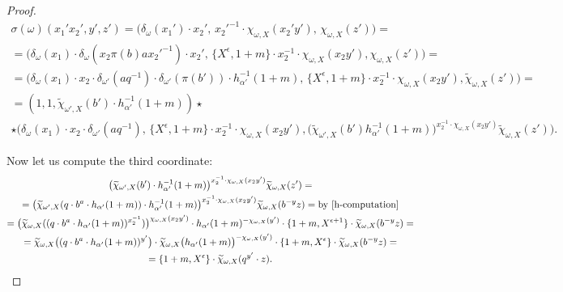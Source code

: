 \begin{proof}
\begin{multline} \label{eq:computation1}
 \sigma(\omega)(x_1'x_2', y', z') =
 \bigl(\delta_\omega(x_1') \cdot x_2',\, x_2'^{-1}\cdot \chi_{\omega, X}(x_2' y'),\, \chi_{\omega, X}(z')\bigr) = \\
 = \bigl(\delta_\omega(x_1) \cdot \delta_\omega(x_2 \pi(b) a {x_2'}^{-1}) \cdot x_2',\, \{X^\epsilon, 1+m\} \cdot x_2^{-1}\cdot \chi_{\omega, X}(x_2 y'), \chi_{\omega, X}(z') \bigr) = \\
 = \bigl(\delta_\omega(x_1) \cdot x_2 \cdot \delta_{\omega'}(aq^{-1}) \cdot \delta_{\omega'}(\pi(b')) \cdot h^{-1}_{\alpha'}(1+m),\, \{X^\epsilon, 1+m\} \cdot x_2^{-1}\cdot \chi_{\omega, X}(x_2 y'), \widetilde{\chi}_{\omega, X}(z') \bigr) = \\
 = (1, 1, \widetilde{\chi}_{\omega', X}(b') \cdot h_{\alpha'}^{-1}(1+m)) \star \\ \star \bigl(\delta_\omega(x_1) \cdot x_2 \cdot \delta_{\omega'}(aq^{-1}),\, \{X^\epsilon, 1+m\} \cdot x_2^{-1}\cdot \chi_{\omega, X}(x_2 y'), \bigl(\widetilde{\chi}_{\omega', X}(b') h^{-1}_{\alpha'}(1+m)\bigr)^{x_2^{-1} \cdot \chi_{\omega, X}(x_2 y')} \widetilde{\chi}_{\omega, X}(z') \bigr).
\end{multline}


Now let us compute the third coordinate:
\begin{multline} \bigl(\widetilde{\chi}_{\omega', X}(b') \cdot h^{-1}_{\alpha'}(1+m)\bigr)^{x_2^{-1} \cdot \chi_{\omega, X}(x_2 y')} \widetilde{\chi}_{\omega, X}(z') = \\ =
\bigl(\widetilde{\chi}_{\omega', X}(q \cdot b^a \cdot h_{\alpha'}(1+m)) \cdot h^{-1}_{\alpha'}(1+m)\bigr)^{x_2^{-1} \cdot \chi_{\omega, X}(x_2 y')} \widetilde{\chi}_{\omega, X}(b^{-y}z) = \text{by~\cref{h-computation}}  \\ = \bigl(\widetilde{\chi}_{\omega, X}((q \cdot b^a \cdot h_{\alpha'}(1+m))^{x_2^{-1}}) \bigr)^{\chi_{\omega, X}(x_2 y')} \cdot h_{\alpha'}(1+m)^{-\chi_{\omega, X}(y')} \cdot \{1 + m, X^{\epsilon + 1} \} \cdot \widetilde{\chi}_{\omega, X}(b^{-y}z) = \\ = \widetilde{\chi}_{\omega, X}\bigl((q \cdot b^a \cdot h_{\alpha'}(1+m))^{y'}\bigr) \cdot \widetilde{\chi}_{\omega, X}\bigl(h_{\alpha'}(1+m)\bigr)^{-\chi_{\omega, X}(y')} \cdot \{1 + m, X^\epsilon \} \cdot \widetilde{\chi}_{\omega, X}(b^{-y}z) = \\ = \{ 1+m, X^\epsilon \} \cdot \widetilde{\chi}_{\omega, X}(q^{y'} \cdot z).
\end{multline}



\end{proof}
